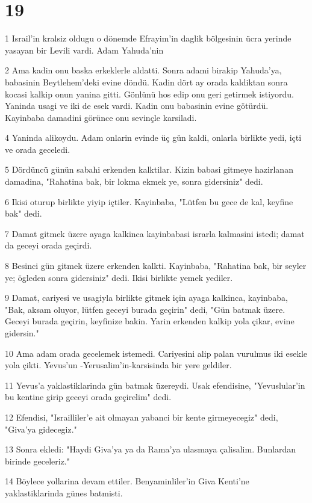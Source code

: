 \chapter{19}

\par 1 Israil'in kralsiz oldugu o dönemde Efrayim'in daglik bölgesinin ücra yerinde yasayan bir Levili vardi. Adam Yahuda'nin
\par 2 Ama kadin onu baska erkeklerle aldatti. Sonra adami birakip Yahuda'ya, babasinin Beytlehem'deki evine döndü. Kadin dört ay orada kaldiktan sonra kocasi kalkip onun yanina gitti. Gönlünü hos edip onu geri getirmek istiyordu. Yaninda usagi ve iki de esek vardi. Kadin onu babasinin evine götürdü. Kayinbaba damadini görünce onu sevinçle karsiladi.
\par 4 Yaninda alikoydu. Adam onlarin evinde üç gün kaldi, onlarla birlikte yedi, içti ve orada geceledi.
\par 5 Dördüncü günün sabahi erkenden kalktilar. Kizin babasi gitmeye hazirlanan damadina, "Rahatina bak, bir lokma ekmek ye, sonra gidersiniz" dedi.
\par 6 Ikisi oturup birlikte yiyip içtiler. Kayinbaba, "Lütfen bu gece de kal, keyfine bak" dedi.
\par 7 Damat gitmek üzere ayaga kalkinca kayinbabasi israrla kalmasini istedi; damat da geceyi orada geçirdi.
\par 8 Besinci gün gitmek üzere erkenden kalkti. Kayinbaba, "Rahatina bak, bir seyler ye; ögleden sonra gidersiniz" dedi. Ikisi birlikte yemek yediler.
\par 9 Damat, cariyesi ve usagiyla birlikte gitmek için ayaga kalkinca, kayinbaba, "Bak, aksam oluyor, lütfen geceyi burada geçirin" dedi, "Gün batmak üzere. Geceyi burada geçirin, keyfinize bakin. Yarin erkenden kalkip yola çikar, evine gidersin."
\par 10 Ama adam orada gecelemek istemedi. Cariyesini alip palan vurulmus iki esekle yola çikti. Yevus'un -Yerusalim'in-karsisinda bir yere geldiler.
\par 11 Yevus'a yaklastiklarinda gün batmak üzereydi. Usak efendisine, "Yevuslular'in bu kentine girip geceyi orada geçirelim" dedi.
\par 12 Efendisi, "Israilliler'e ait olmayan yabanci bir kente girmeyecegiz" dedi, "Giva'ya gidecegiz."
\par 13 Sonra ekledi: "Haydi Giva'ya ya da Rama'ya ulasmaya çalisalim. Bunlardan birinde geceleriz."
\par 14 Böylece yollarina devam ettiler. Benyaminliler'in Giva Kenti'ne yaklastiklarinda günes batmisti.
